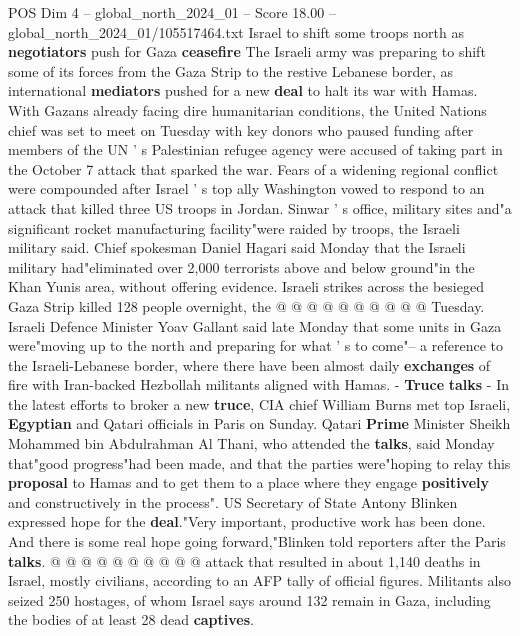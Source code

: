 \begin{textsample}{POS Dim 4 – global\_north\_2024\_01 – Score 18.00 – global\_north\_2024\_01/105517464.txt}  \label{ex:f4_pos_339}
Israel to shift some troops north as \textbf{negotiators} push for Gaza \textbf{ceasefire} The Israeli army was preparing to shift some of its forces from the Gaza Strip to the restive Lebanese border, as international \textbf{mediators} pushed for a new \textbf{deal} to halt its war with Hamas.
With Gazans already facing dire humanitarian conditions, the United Nations chief was set to meet on Tuesday with key donors who paused funding after members of the UN ' s Palestinian refugee agency were accused of taking part in the October 7 attack that sparked the war.
Fears of a widening regional conflict were compounded after Israel ' s top ally Washington vowed to respond to an attack that killed three US troops in Jordan.
Sinwar ' s office, military sites and"a significant rocket manufacturing facility"were raided by troops, the Israeli military said.
Chief spokesman Daniel Hagari said Monday that the Israeli military had"eliminated over 2,000 terrorists above and below ground"in the Khan Yunis area, without offering evidence.
Israeli strikes across the besieged Gaza Strip killed 128 people overnight, the @ @ @ @ @ @ @ @ @ @ Tuesday.
Israeli Defence Minister Yoav Gallant said late Monday that some units in Gaza were"moving up to the north and preparing for what ' s to come"-- a reference to the Israeli-Lebanese border, where there have been almost daily \textbf{exchanges} of fire with Iran-backed Hezbollah militants aligned with Hamas. - \textbf{Truce} \textbf{talks} - In the latest efforts to broker a new \textbf{truce}, CIA chief William Burns met top Israeli, \textbf{Egyptian} and Qatari officials in Paris on Sunday.
Qatari \textbf{Prime} Minister Sheikh Mohammed bin Abdulrahman Al Thani, who attended the \textbf{talks}, said Monday that"good progress"had been made, and that the parties were"hoping to relay this \textbf{proposal} to Hamas and to get them to a place where they engage \textbf{positively} and constructively in the process".
US Secretary of State Antony Blinken expressed hope for the \textbf{deal}."Very important, productive work has been done.
And there is some real hope going forward,"Blinken told reporters after the Paris \textbf{talks}. @ @ @ @ @ @ @ @ @ @ attack that resulted in about 1,140 deaths in Israel, mostly civilians, according to an AFP tally of official figures.
Militants also seized 250 hostages, of whom Israel says around 132 remain in Gaza, including the bodies of at least 28 dead \textbf{captives}.

\end{textsample}
